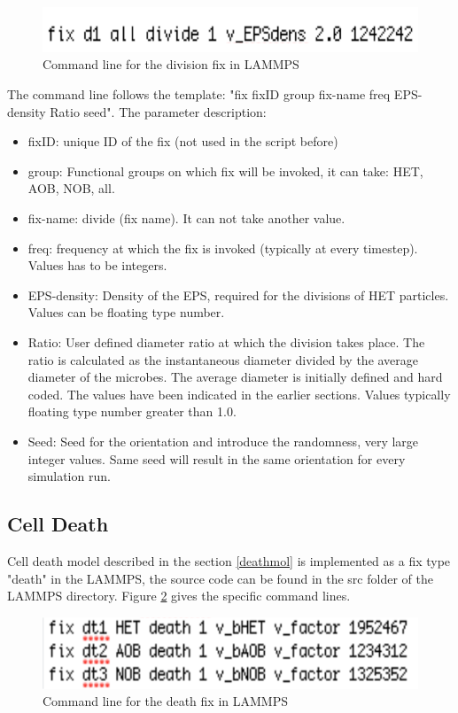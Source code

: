 \documentclass[11pt,a4paper,openright]{article}
\begin{document}
\begin{figure}[H]
\begin{center}
  \includegraphics[width=0.6\columnwidth]{Figs/divisionfix.pdf}
\caption{Command line for the division fix in LAMMPS}
\label{fig:division}       %
\end{center}
\end{figure}

The command line follows the template: "fix fixID group fix-name freq EPS-density Ratio seed". The parameter description:
\begin{itemize}
\item fixID: unique ID of the fix (not used in the script before)
\item group: Functional groups on which fix will be invoked, it can take: HET, AOB, NOB, all.
\item fix-name: divide (fix name). It can not take another value.
\item freq: frequency at which the fix is invoked (typically at every timestep). Values has to be integers.
\item EPS-density: Density of the EPS, required for the divisions of HET particles. Values can be floating type number.
\item Ratio: User defined diameter ratio at which the division takes place. The ratio is calculated as the instantaneous diameter divided by the average diameter of the microbes. The average diameter is initially defined and hard coded. The values have been indicated in the earlier sections. Values typically floating type number greater than 1.0.
\item Seed: Seed for the orientation and introduce the randomness, very large integer values. Same seed will result in the same orientation for every simulation run. 
\end{itemize}

\subsection{Cell Death}
Cell death model described in the section \ref{deathmol} is implemented as a fix type "death" in the LAMMPS, the source code can be found in the src folder of the LAMMPS directory. Figure \ref{fig:death} gives the specific command lines.

\begin{figure}[H]
\begin{center}
  \includegraphics[width=0.6\columnwidth]{Figs/deathfix.pdf}
\caption{Command line for the death fix in LAMMPS}
\label{fig:death}       %
\end{center}
\end{figure}
\end{document}
